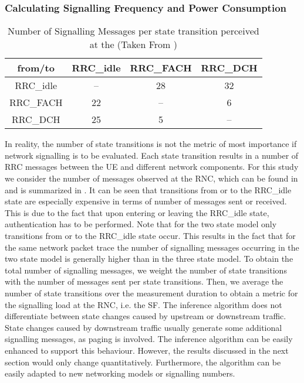 \subsubsection*{Calculating Signalling Frequency and Power Consumption}\label{sec:network:network_traces:calculating_metrics}

\begin{table}
\centering
  \caption{Number of Signalling Messages per  state transition perceived at the  (Taken From \cite{3GPP_RRC_Spec})}
  \label{tab:network:network_traces:calculating_metrics:signalling_messages}
\begin{tabular}{cccc}
	\toprule
    from/to & \gls{RRC_idle} & \gls{RRC_FACH} & \gls{RRC_DCH}\\
    \midrule
    \gls{RRC_idle} & -- & 28 & 32\\
    \gls{RRC_FACH} & 22 & -- & 6\\
    \gls{RRC_DCH} & 25 & 5 & --\\
    \bottomrule    
	\end{tabular}
\end{table}

In reality, the number of state transitions is not the metric of most importance if network signalling is to be evaluated.
Each state transition results in a number of \gls{RRC} messages between the \gls{UE} and different network components.
For this study we consider the number of messages observed at the \gls{RNC}, which can be found in \cite{3GPP_RRC_Spec} and is summarized in .
It can be seen that transitions from or to the \gls{RRC_idle} state are especially expensive in terms of number of messages sent or received.
This is due to the fact that upon entering or leaving the \gls{RRC_idle} state, authentication has to be performed. 
Note that for the two state model only transitions from or to the \gls{RRC_idle} state occur.
This results in the fact that for the same network packet trace the number of signalling messages occurring in the two state model is generally higher than in the three state model.
To obtain the total number of signalling messages, we weight the number of state transitions with the number of messages sent per state transitions.
Then, we average the number of state transitions over the measurement duration to obtain a metric for the signalling load at the \gls{RNC}, i.e. the \gls{SF}.
The inference algorithm does not differentiate between state changes caused by upstream or downstream traffic.
State changes caused by downstream traffic usually generate some additional signalling messages, as paging is involved.
The inference algorithm can be easily enhanced to support this behaviour.
However, the results discussed in the next section would only change quantitatively.
Furthermore, the algorithm can be easily adapted to new networking models or signalling numbers.

